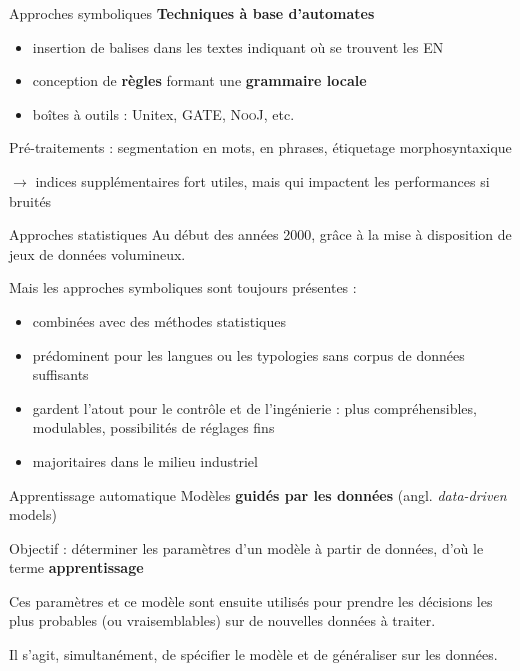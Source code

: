 \documentclass[xetex,xcolor={table,usenames,dvipsnames}]{beamer}
\newcommand{\bolder}[1]{{\color{purple}\bfseries#1}}
\begin{document}
\begin{frame}{Approches symboliques}
	\bolder{Techniques à base d'automates}
	
	\begin{itemize}
		\item insertion de balises dans les textes indiquant où se trouvent les \textsc{EN}
		\item conception de \textcolor{deepblue}{\textbf{règles}} formant une \textcolor{deepblue}{\textbf{grammaire locale}}
		\item boîtes à outils : Unitex, \textsc{GATE}, \textsc{NooJ}, etc.
	\end{itemize}
	
	Pré-traitements : segmentation en mots, en phrases, étiquetage morphosyntaxique
	
	
	$\rightarrow$ indices supplémentaires fort utiles, mais qui impactent les performances si bruités
\end{frame}

\begin{frame}{Approches statistiques}
	Au début des années 2000, grâce à la mise à disposition de jeux de données volumineux.
	
	Mais les approches symboliques sont toujours présentes : 
	\begin{itemize}
		\item combinées avec des méthodes statistiques
		\item prédominent pour les langues ou les typologies sans corpus de données suffisants
		\item gardent l'atout pour le contrôle et de l'ingénierie : plus compréhensibles, modulables, possibilités de réglages fins
		\item majoritaires dans le milieu industriel
		\end{itemize}
\end{frame}

\begin{frame}{Apprentissage automatique}
	Modèles \bolder{guidés par les données} (angl. \textit{data-driven} models)
	
	Objectif : déterminer les paramètres d'un modèle à partir de données, d'où le terme \bolder{apprentissage}
	
	Ces paramètres et ce modèle sont ensuite utilisés pour prendre les décisions les plus probables (ou vraisemblables) sur de nouvelles données à traiter.
	
	Il s'agit, simultanément, de spécifier le modèle et de généraliser sur les données.
\end{frame}
\end{document}
